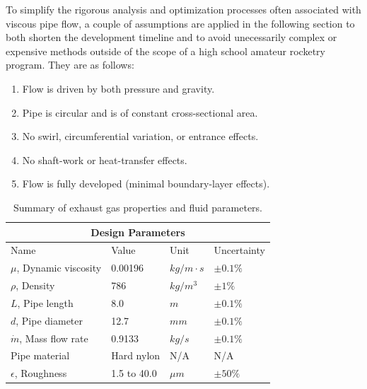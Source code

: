 \documentclass[9pt]{article} %
\numberwithin{equation}{section} %
\begin{document}
To simplify the rigorous analysis and optimization processes often associated with viscous pipe flow, a couple of assumptions are applied in the following section to both shorten the development timeline and to avoid unecessarily complex or expensive methods outside of the scope of a high school amateur rocketry program. They are as follows:
\begin{enumerate}
\item Flow is driven by both pressure and gravity.
\item Pipe is circular and is of constant cross-sectional area. \label{itm:constant-area}
\item No swirl, circumferential variation, or entrance effects.
\item No shaft-work or heat-transfer effects. \label{itm:heat-effects}
\item Flow is fully developed (minimal boundary-layer effects).
\end{enumerate}

\begin{table}[!htb]
\centering
\begin{tabular}{ |p{4cm}||p{4cm}|p{2cm}|p{2cm}|  }
\hline
\multicolumn{4}{|c|}{Design Parameters} \\
\hline
Name & Value & Unit & Uncertainty \\
\hline
$\mu$, Dynamic viscosity  &  0.00196  &  $kg/m \cdot s$  &  $\pm 0.1 \%$ \\
$\rho$, Density  &  786  &  $kg/m^{3}$  &  $\pm 1 \%$ \\
$L$, Pipe length  &  8.0  &  $m$  &  $\pm 0.1 \%$  \\
$d$, Pipe diameter  &  12.7  &  $mm$  &   $\pm 0.1 \%$ \\
$\dot{m}$, Mass flow rate  &  0.9133  &  $kg/s$  &   $\pm 0.1 \%$ \\
Pipe material  &  Hard nylon  &  N/A  &  N/A \\
$\epsilon$, Roughness  &  1.5 to 40.0  &  $\mu m$  &  $\pm 50 \%$ \\
\hline
\end{tabular}
\caption{Summary of exhaust gas properties and fluid parameters.}
\label{table:pipe_parameters}
\end{table}

\printbibliography
\end{document}
